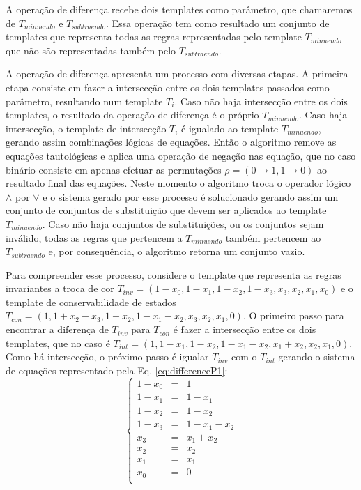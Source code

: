 \documentclass[12pt, a4paper]{article}
\begin{document}
A operação de diferença recebe dois templates como parâmetro, que chamaremos de $T_{minuendo}$ e $T_{subtraendo}$. Essa operação tem como resultado um conjunto de templates que representa todas as regras representadas pelo template $T_{minuendo}$ que não são representadas também pelo $T_{subtraendo}$.

A operação de diferença apresenta um processo com diversas etapas. A primeira etapa consiste em fazer a intersecção entre os dois templates passados como parâmetro, resultando num template $T_i$. Caso não haja intersecção entre os dois templates, o resultado da operação de diferença é o próprio $T_{minuendo}$. Caso haja intersecção, o template de intersecção $T_i$ é igualado ao template $T_{minuendo}$, gerando assim combinações lógicas de equações. Então o algoritmo remove as equações tautológicas e aplica uma operação de negação nas equação, que no caso binário consiste em apenas efetuar as permutações $\rho = (0 \to 1, 1 \to 0)$ ao resultado final das equações. Neste momento o algoritmo troca o operador lógico $\wedge$ por $\vee$ e o sistema gerado por esse processo é solucionado gerando assim um conjunto de conjuntos de substituição que devem ser aplicados ao template $T_{minuendo}$. Caso não haja conjuntos de substituições, ou os conjuntos sejam inválido, todas as regras que pertencem a $T_{minuendo}$ também pertencem ao $T_{subtraendo}$ e, por consequência, o algoritmo retorna um conjunto vazio.

Para compreender esse processo, considere o template que representa as regras invariantes a troca de cor $T_{inv} = (1 - x_0, 1 - x_1, 1 - x_2, 1 - x_3, x_3, x_2, x_1, x_0)$ e o template de conservabilidade de estados $T_{con} = (1, 1 + x_2 - x_3, 1 - x_2, 1 - x_1 - x_2, x_3, x_2, x_1, 0)$. O primeiro passo para encontrar a diferença de $T_{inv}$ para $T_{con}$ é fazer a intersecção entre os dois templates, que no caso é $T_{int} = (1, 1 - x_1, 1 - x_2, 1 - x_1 - x_2, x_1 + x_2, x_2, x_1, 0)$. Como há intersecção, o próximo passo é igualar $T_{inv}$ com o $T_{int}$ gerando o sistema de equações representado pela Eq. \ref{eq:differenceP1}: \begin{equation} \left\{\begin{matrix} 1 - x_0	& = &	1				\\ 1 - x_1	& = &	1 - x_1			\\ 1 - x_2	& = &	1 - x_2			\\ 1 - x_3	& = &	1 - x_1 - x_2	\\
x_3		& = &	x_1 + x_2		\\
x_2		& = &	x_2				\\
x_1		& = &	x_1				\\
x_0		& = &	0				\\
\end{matrix}\right.
\label{eq:differenceP1}
\end{equation}
\end{document}
